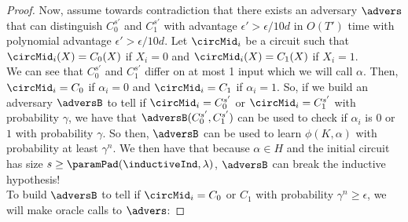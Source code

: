 \begin{lemma}
\begin{proof}
		Now, assume towards contradiction that there exists an adversary $\advers$ that can distinguish $C_0^{s'}$ and $C_1^{s'}$ with advantage $\epsilon' > \epsilon / 10d$
		in $O(T')$ time with polynomial advantage $\epsilon' > \epsilon / 10d$.
		Let $\circMid_i$ be a circuit such that $\circMid_i(X) = C_0(X)$ if $X_i = 0$ and $\circMid_i(X) = C_1(X)$ if $X_i = 1$.\\
		We can see that $C_0^{s'}$ and $C_1^{s'}$ differ on at most 1 input which we will call $\alpha$. %
		Then, $\circMid_i = C_0$ if $\alpha_i = 0$ and $\circMid_i = C_1$ if $\alpha_i = 1$.
		So, if we build an adversary $\adversB$ to tell if $\circMid_i = C_0^{s'}$ or $\circMid_i = C_1^{s'}$ with probability $\gamma$,
		we have that $\adversB(C_0^{s'}, C_1^{s'})$ can be used to check if $\alpha_i$ is $0$ or $1$ with probability $\gamma$.
		So then, $\adversB$ can be used to learn $\phi(K, \alpha)$ with probability at least $\gamma^n$.
		We then have that because $\alpha \in H$ and the initial circuit has size $s \geq \paramPad(\inductiveInd, \lambda)$, $\adversB$ can break the inductive hypothesis!\\
		\linebreak
		To build $\adversB$ to tell if $\circMid_i = C_0$ or $C_1$ with probability $\gamma^n \geq \epsilon$, we will make oracle calls to $\advers$:

\end{proof}
\end{lemma}
